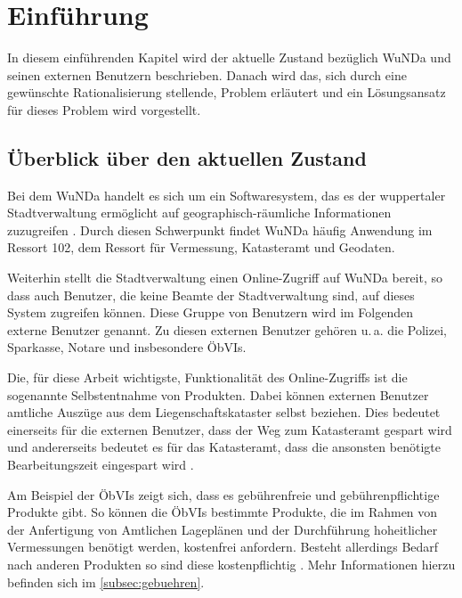 \chapter{Einführung}
In diesem einführenden Kapitel wird der aktuelle Zustand bezüglich \acs{WuNDa} und seinen externen Benutzern beschrieben. Danach wird das, sich durch eine gewünschte Rationalisierung stellende, Problem erläutert und ein Lösungsansatz für dieses Problem wird vorgestellt.

\section{Überblick über den aktuellen Zustand}
Bei dem \ac{WuNDa} handelt es sich um ein Softwaresystem, das es der wuppertaler Stadtverwaltung ermöglicht auf geographisch-räumliche Informationen zuzugreifen \autocite[vgl.][]{cismet-wunda}. Durch diesen Schwerpunkt findet \ac{WuNDa} häufig Anwendung im Ressort 102, dem Ressort für Vermessung, Katasteramt und Geodaten.

Weiterhin stellt die Stadtverwaltung einen Online-Zugriff auf \ac{WuNDa} bereit, so dass auch Benutzer, die keine Beamte der Stadtverwaltung sind, auf dieses System zugreifen können. Diese Gruppe von Benutzern wird im Folgenden externe Benutzer genannt.
Zu diesen externen Benutzer gehören u.\,a. die Polizei, Sparkasse, Notare und insbesondere \acp{ÖbVI}.

Die, für diese Arbeit wichtigste, Funktionalität des Online-Zugriffs ist die sogenannte Selbstentnahme von Produkten. Dabei können externen Benutzer amtliche Auszüge aus dem Liegenschaftskataster selbst beziehen. Dies bedeutet einerseits für die externen Benutzer, dass der Weg zum Katasteramt gespart wird und andererseits bedeutet es für das Katasteramt, dass die ansonsten benötigte Bearbeitungszeit eingespart wird \autocite[vgl.][]{wupp-wunda}.

Am Beispiel der \acp{ÖbVI} zeigt sich, dass es gebührenfreie und gebührenpflichtige Produkte gibt.
So können die \acp{ÖbVI} bestimmte Produkte, die im Rahmen von der Anfertigung von Amtlichen Lageplänen und der Durchführung hoheitlicher Vermessungen benötigt werden, kostenfrei anfordern.
Besteht allerdings Bedarf nach anderen Produkten so sind diese kostenpflichtig \autocite[vgl.][]{wupp-wunda-oebvi}. Mehr Informationen hierzu befinden sich im \autoref{subsec:gebuehren}.

